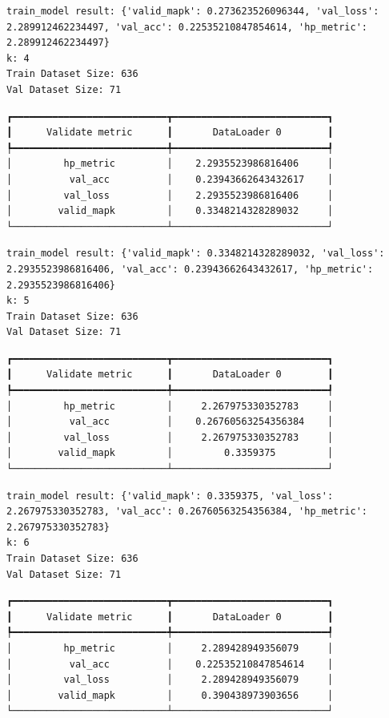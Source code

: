 \documentclass[
  letterpaper,
  DIV=11,
  numbers=noendperiod]{scrreprt}
\begin{document}
\begin{verbatim}
train_model result: {'valid_mapk': 0.273623526096344, 'val_loss': 2.289912462234497, 'val_acc': 0.22535210847854614, 'hp_metric': 2.289912462234497}
k: 4
Train Dataset Size: 636
Val Dataset Size: 71
\end{verbatim}

\begin{verbatim}
┏━━━━━━━━━━━━━━━━━━━━━━━━━━━┳━━━━━━━━━━━━━━━━━━━━━━━━━━━┓
┃      Validate metric      ┃       DataLoader 0        ┃
┡━━━━━━━━━━━━━━━━━━━━━━━━━━━╇━━━━━━━━━━━━━━━━━━━━━━━━━━━┩
│         hp_metric         │    2.2935523986816406     │
│          val_acc          │    0.23943662643432617    │
│         val_loss          │    2.2935523986816406     │
│        valid_mapk         │    0.3348214328289032     │
└───────────────────────────┴───────────────────────────┘
\end{verbatim}

\begin{verbatim}
train_model result: {'valid_mapk': 0.3348214328289032, 'val_loss': 2.2935523986816406, 'val_acc': 0.23943662643432617, 'hp_metric': 2.2935523986816406}
k: 5
Train Dataset Size: 636
Val Dataset Size: 71
\end{verbatim}

\begin{verbatim}
┏━━━━━━━━━━━━━━━━━━━━━━━━━━━┳━━━━━━━━━━━━━━━━━━━━━━━━━━━┓
┃      Validate metric      ┃       DataLoader 0        ┃
┡━━━━━━━━━━━━━━━━━━━━━━━━━━━╇━━━━━━━━━━━━━━━━━━━━━━━━━━━┩
│         hp_metric         │     2.267975330352783     │
│          val_acc          │    0.26760563254356384    │
│         val_loss          │     2.267975330352783     │
│        valid_mapk         │         0.3359375         │
└───────────────────────────┴───────────────────────────┘
\end{verbatim}

\begin{verbatim}
train_model result: {'valid_mapk': 0.3359375, 'val_loss': 2.267975330352783, 'val_acc': 0.26760563254356384, 'hp_metric': 2.267975330352783}
k: 6
Train Dataset Size: 636
Val Dataset Size: 71
\end{verbatim}

\begin{verbatim}
┏━━━━━━━━━━━━━━━━━━━━━━━━━━━┳━━━━━━━━━━━━━━━━━━━━━━━━━━━┓
┃      Validate metric      ┃       DataLoader 0        ┃
┡━━━━━━━━━━━━━━━━━━━━━━━━━━━╇━━━━━━━━━━━━━━━━━━━━━━━━━━━┩
│         hp_metric         │     2.289428949356079     │
│          val_acc          │    0.22535210847854614    │
│         val_loss          │     2.289428949356079     │
│        valid_mapk         │     0.390438973903656     │
└───────────────────────────┴───────────────────────────┘
\end{verbatim}
\end{document}
